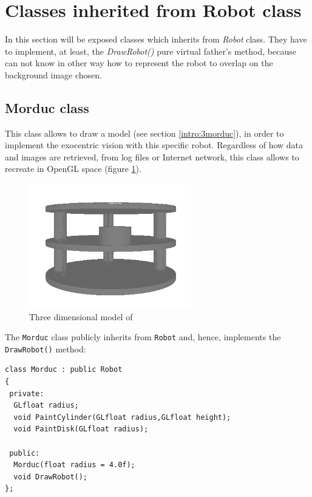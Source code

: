\section{Classes inherited from Robot class}
\label{concr:robot_classes}

In this section will be exposed classes which inherits
from \textit{Robot} class. They have to implement, at least,
the \textit{DrawRobot()} pure virtual father's method,
because \framework{} can not know in other way how to
represent the robot to overlap on the background image chosen.

\subsection{Morduc class}
\label{concr:robot_classes:concr:morduc}

This class allows to draw a \morduc{} model (see section 
\ref{intro:3morduc}), in order to implement the exocentric
vision with this specific robot. Regardless of how data and images
are retrieved, from log files or Internet network, this class
allows to recreate \morduc{} in OpenGL space (figure
\ref{fig:3morduc_opengl}).

\begin{figure}[!h]
  \begin{center}
    \includegraphics[width=200pt]{img/3morduc_opengl.png}
    \caption{Three dimensional model of \morduc}
    \label{fig:3morduc_opengl}
  \end{center}
\end{figure}

The \texttt{Morduc} class publicly inherits from \texttt{Robot} 
and, hence, implements the \texttt{DrawRobot()} method:
\\
\begin{lstlisting}[caption={\texttt{Morduc} class declaration},
    label={code:morducclass}]
class Morduc : public Robot
{
 private:
  GLfloat radius;
  void PaintCylinder(GLfloat radius,GLfloat height);
  void PaintDisk(GLfloat radius);

 public:
  Morduc(float radius = 4.0f);
  void DrawRobot();
};
\end{lstlisting}

